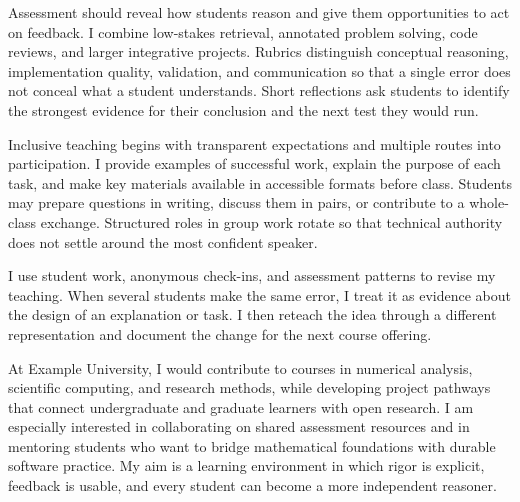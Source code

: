\documentclass[type=teaching]{careerdossier-statement}
\begin{document}

Assessment should reveal how students reason and give them opportunities to act
on feedback. I combine low-stakes retrieval, annotated problem solving, code
reviews, and larger integrative projects. Rubrics distinguish conceptual
reasoning, implementation quality, validation, and communication so that a
single error does not conceal what a student understands. Short reflections ask
students to identify the strongest evidence for their conclusion and the next
test they would run.

Inclusive teaching begins with transparent expectations and multiple routes
into participation. I provide examples of successful work, explain the purpose
of each task, and make key materials available in accessible formats before
class. Students may prepare questions in writing, discuss them in pairs, or
contribute to a whole-class exchange. Structured roles in group work rotate so
that technical authority does not settle around the most confident speaker.

I use student work, anonymous check-ins, and assessment patterns to revise my
teaching. When several students make the same error, I treat it as evidence
about the design of an explanation or task. I then reteach the idea through a
different representation and document the change for the next course offering.


At Example University, I would contribute to courses in numerical analysis,
scientific computing, and research methods, while developing project pathways
that connect undergraduate and graduate learners with open research. I am
especially interested in collaborating on shared assessment resources and in
mentoring students who want to bridge mathematical foundations with durable
software practice. My aim is a learning environment in which rigor is explicit,
feedback is usable, and every student can become a more independent reasoner.
\end{document}
